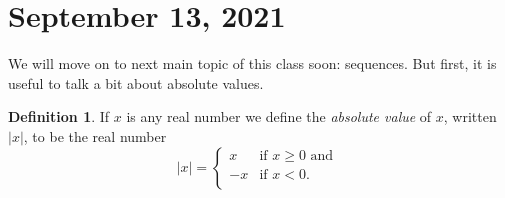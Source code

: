 \documentclass[12pt]{amsart}
\numberwithin{equation}{section}
\theoremstyle{plain} %
\newtheorem{prop}[equation]{Proposition}
\newcommand{\Sept}[1]{\section{September #1, 2021}}
\theoremstyle{definition}
\newtheorem{defn}[equation]{Definition}
\theoremstyle{remark}
\begin{document}
\Sept{13}


We will move on to next main topic of this class soon: sequences. But first, it is useful to talk a bit about absolute values.

\begin{defn} If $x$ is any real number we define the {\em absolute value} of $x$, written $|x|$, to be the real number
$$
|x| = \begin{cases}
x & \text{if $x \geq 0$ and } \\
-x & \text{if $x < 0$.} \\
\end{cases}
$$
\end{defn}


 








\end{document}
